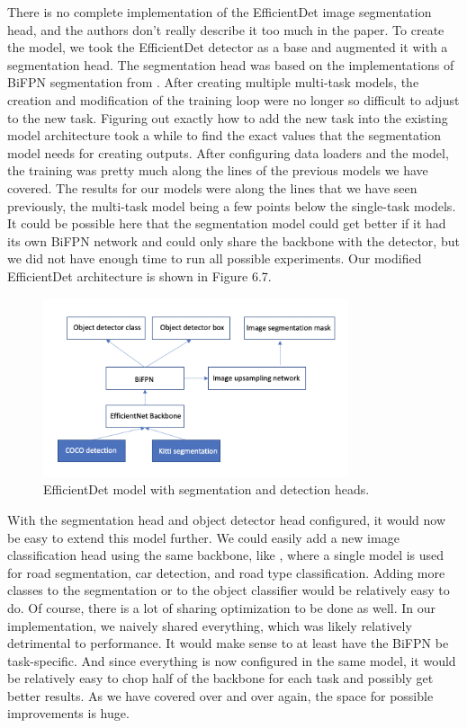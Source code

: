 There is no complete implementation of the EfficientDet image segmentation head, and the authors don't really describe it too much in the paper.
To create the model, we took the EfficientDet detector as a base and augmented it with a segmentation head.
The segmentation head was based on the implementations of BiFPN segmentation from \citep{segment_pytorch}.
After creating multiple multi-task models, the creation and modification of the training loop were no longer so difficult to adjust to the new task.
Figuring out exactly how to add the new task into the existing model architecture took a while to find the exact values that the segmentation model needs for creating outputs.
After configuring data loaders and the model, the training was pretty much along the lines of the previous models we have covered.
The results for our models were along the lines that we have seen previously, the multi-task model being a few points below the single-task models.
It could be possible here that the segmentation model could get better if it had its own BiFPN network and could only share the backbone with the detector, but we did not have enough time to run all possible experiments.
Our modified EfficientDet architecture is shown in Figure 6.7.

\begin{figure}[h!] 
    \centering 
    \includegraphics[width=0.8\textwidth]{imgs/efficientdet-multi.png}
    \caption{EfficientDet model with segmentation and detection heads.}
\end{figure}

With the segmentation head and object detector head configured, it would now be easy to extend this model further.
We could easily add a new image classification head using the same backbone, like \citep{multinet}, where a single model is used for road segmentation, car detection, and road type classification.
Adding more classes to the segmentation or to the object classifier would be relatively easy to do.
Of course, there is a lot of sharing optimization to be done as well.
In our implementation, we naively shared everything, which was likely relatively detrimental to performance.
It would make sense to at least have the BiFPN be task-specific.
And since everything is now configured in the same model, it would be relatively easy to chop half of the backbone for each task and possibly get better results.
As we have covered over and over again, the space for possible improvements is huge.

